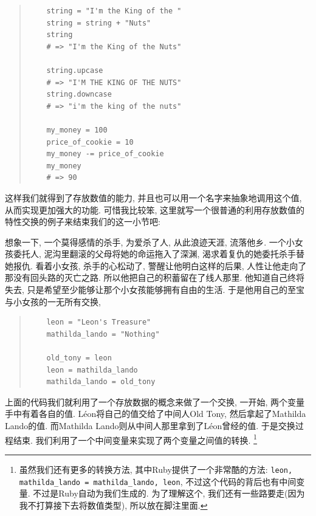 \begin{quotation}
  \begin{verbatim}
    string = "I'm the King of the "
    string = string + "Nuts"
    string
    # => "I'm the King of the Nuts"

    string.upcase
    # => "I'M THE KING OF THE NUTS"
    string.downcase
    # => "i'm the king of the nuts"

    my_money = 100
    price_of_cookie = 10
    my_money -= price_of_cookie
    my_money
    # => 90
  \end{verbatim}
\end{quotation}

这样我们就得到了存放数值的能力, 并且也可以用一个名字来抽象地调用这个值, 从而实现更加强大的功能. 可惜我比较笨, 这里就写一个很普通的利用存放数值的特性交换的例子来结束我们的这一小节吧: 

想象一下, 一个莫得感情的杀手, 为爱杀了人, 从此浪迹天涯, 流落他乡. 一个小女孩委托人, 泥沟里翻滚的父母将她的命运拖入了深渊, 渴求着复仇的她委托杀手替她报仇. 看着小女孩, 杀手的心松动了, 警醒让他明白这样的后果, 人性让他走向了那没有回头路的灭亡之路. 所以他把自己的积蓄留在了线人那里. 他知道自己终将失去, 只是希望至少能够让那个小女孩能够拥有自由的生活. 于是他用自己的至宝与小女孩的一无所有交换, 

\begin{quotation}
  \begin{verbatim}
    leon = "Leon's Treasure"
    mathilda_lando = "Nothing"

    old_tony = leon
    leon = mathilda_lando
    mathilda_lando = old_tony
  \end{verbatim}
\end{quotation}

上面的代码我们就利用了一个存放数据的概念来做了一个交换, 一开始, 两个变量手中有着各自的值. Léon将自己的值交给了中间人Old Tony, 然后拿起了Mathilda Lando的值. 而Mathilda Lando则从中间人那里拿到了Léon曾经的值. 于是交换过程结束. 我们利用了一个中间变量来实现了两个变量之间值的转换. \footnote{虽然我们还有更多的转换方法, 其中Ruby提供了一个非常酷的方法: \texttt{leon, mathilda_lando = mathilda_lando, leon}, 不过这个代码的背后也有中间变量. 不过是Ruby自动为我们生成的. 为了理解这个, 我们还有一些路要走(因为我不打算接下去将数值类型), 所以放在脚注里面. }

